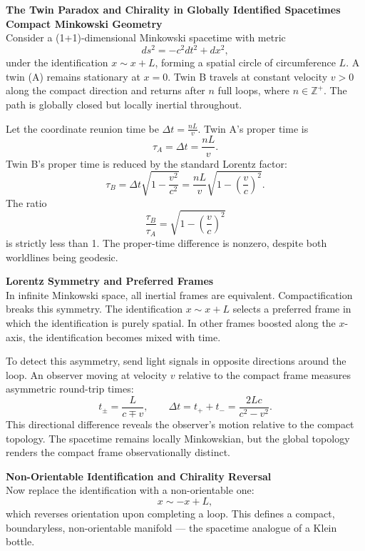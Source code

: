 \begin{technical}
{\Large\textbf{The Twin Paradox and Chirality in Globally Identified Spacetimes}}\\[0.7em]

\vspace{0.5em}
\noindent\textbf{Compact Minkowski Geometry}\\[0.5em]
Consider a (1+1)-dimensional Minkowski spacetime with metric
\[
ds^2 = -c^2 dt^2 + dx^2,
\]
under the identification \(x \sim x + L\), forming a spatial circle of circumference \(L\). A twin (A) remains stationary at \(x = 0\). Twin B travels at constant velocity \(v > 0\) along the compact direction and returns after $n$ full loops, where \(n \in \mathbb{Z}^+\). The path is globally closed but locally inertial throughout.

Let the coordinate reunion time be \(\Delta t = \frac{nL}{v}\). Twin A’s proper time is
\[
\tau_A = \Delta t = \frac{nL}{v}.
\]
Twin B’s proper time is reduced by the standard Lorentz factor:
\[
\tau_B = \Delta t \sqrt{1 - \frac{v^2}{c^2}} = \frac{nL}{v} \sqrt{1 - \left( \frac{v}{c} \right)^2 }.
\]
The ratio
\[
\frac{\tau_B}{\tau_A} = \sqrt{1 - \left( \frac{v}{c} \right)^2 }
\]
is strictly less than 1. The proper-time difference is nonzero, despite both worldlines being geodesic.

\vspace{0.5em}
\noindent\textbf{Lorentz Symmetry and Preferred Frames}\\[0.5em]
In infinite Minkowski space, all inertial frames are equivalent. Compactification breaks this symmetry. The identification \(x \sim x + L\) selects a preferred frame in which the identification is purely spatial. In other frames boosted along the $x$-axis, the identification becomes mixed with time.

To detect this asymmetry, send light signals in opposite directions around the loop. An observer moving at velocity \(v\) relative to the compact frame measures asymmetric round-trip times:
\[
t_{\pm} = \frac{L}{c \mp v}, \qquad \Delta t = t_+ + t_- = \frac{2Lc}{c^2 - v^2}.
\]
This directional difference reveals the observer’s motion relative to the compact topology. The spacetime remains locally Minkowskian, but the global topology renders the compact frame observationally distinct.

\vspace{0.5em}
\noindent\textbf{Non-Orientable Identification and Chirality Reversal}\\[0.5em]
Now replace the identification with a non-orientable one:
\[
x \sim -x + L,
\]
which reverses orientation upon completing a loop. This defines a compact, boundaryless, non-orientable manifold — the spacetime analogue of a Klein bottle.


\end{technical}

